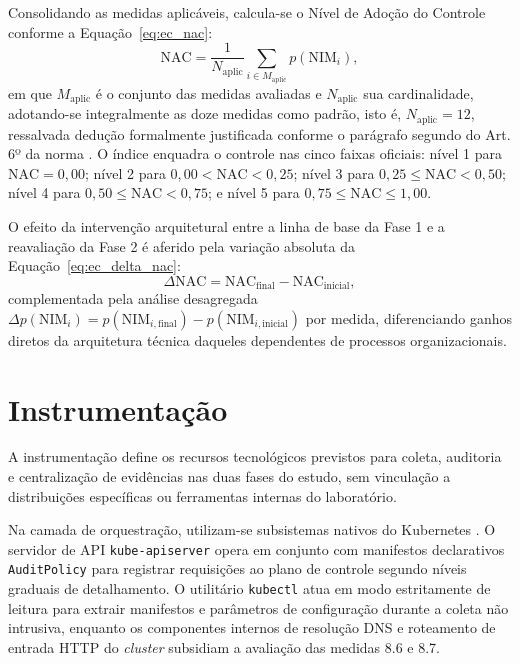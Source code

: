 
Consolidando as medidas aplicáveis, calcula-se o Nível de Adoção do Controle conforme a Equação~\ref{eq:ec_nac}:
\begin{equation}
\label{eq:ec_nac}
\mathrm{NAC} = \frac{1}{N_{\mathrm{aplic}}} \sum_{i \in M_{\mathrm{aplic}}} p(\mathrm{NIM}_i),
\end{equation}
em que $M_{\mathrm{aplic}}$ é o conjunto das medidas avaliadas e $N_{\mathrm{aplic}}$ sua cardinalidade, adotando-se integralmente as doze medidas como padrão, isto é, $N_{\mathrm{aplic}} = 12$, ressalvada dedução formalmente justificada conforme o parágrafo segundo do Art. 6º da norma \cite{in4_2026}. O índice enquadra o controle nas cinco faixas oficiais: nível 1 para $\mathrm{NAC} = 0{,}00$; nível 2 para $0{,}00 < \mathrm{NAC} < 0{,}25$; nível 3 para $0{,}25 \le \mathrm{NAC} < 0{,}50$; nível 4 para $0{,}50 \le \mathrm{NAC} < 0{,}75$; e nível 5 para $0{,}75 \le \mathrm{NAC} \le 1{,}00$.

O efeito da intervenção arquitetural entre a linha de base da Fase 1 e a reavaliação da Fase 2 é aferido pela variação absoluta da Equação~\ref{eq:ec_delta_nac}:
\begin{equation}
\label{eq:ec_delta_nac}
\Delta\mathrm{NAC} = \mathrm{NAC}_{\mathrm{final}} - \mathrm{NAC}_{\mathrm{inicial}},
\end{equation}
complementada pela análise desagregada $\Delta p(\mathrm{NIM}_i) = p(\mathrm{NIM}_{i,\mathrm{final}}) - p(\mathrm{NIM}_{i,\mathrm{inicial}})$ por medida, diferenciando ganhos diretos da arquitetura técnica daqueles dependentes de processos organizacionais.

\section{Instrumentação}
\label{sec:ec_instrumentacao}

A instrumentação define os recursos tecnológicos previstos para coleta, auditoria e centralização de evidências nas duas fases do estudo, sem vinculação a distribuições específicas ou ferramentas internas do laboratório.

Na camada de orquestração, utilizam-se subsistemas nativos do Kubernetes \cite{kubernetes2025}. O servidor de API \texttt{kube-apiserver} opera em conjunto com manifestos declarativos \texttt{AuditPolicy} para registrar requisições ao plano de controle segundo níveis graduais de detalhamento. O utilitário \texttt{kubectl} atua em modo estritamente de leitura para extrair manifestos e parâmetros de configuração durante a coleta não intrusiva, enquanto os componentes internos de resolução DNS e roteamento de entrada HTTP do \textit{cluster} subsidiam a avaliação das medidas 8.6 e 8.7.

